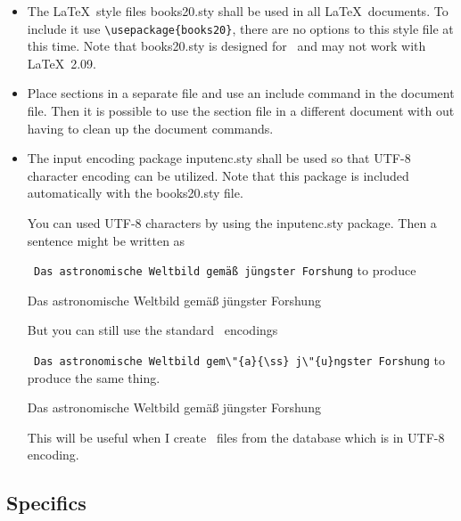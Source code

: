 \documentclass{article}
\begin{document}
\begin{itemize}
  
\item The \LaTeX\ style files books20.sty shall be used in all
  \LaTeX\ documents. To include it use \verb|\usepackage{books20}|, there
  are no options to this style file at this time. Note that books20.sty
  is designed for \LaTeXe\ and may not work with \LaTeX\ 2.09.
  

\item Place sections in a separate file and use an include command in the
  document file. Then it is possible to use the section file in a
  different document with out having to clean up the document commands.

\item {The input encoding package inputenc.sty shall be used so that
  UTF-8 character encoding can be utilized. Note that this package is
  included automatically with the books20.sty file.

  You can used UTF-8 characters by using the inputenc.sty
  package.  Then a sentence might be written as
  
  \verb| Das astronomische Weltbild gemäß jüngster Forshung|
  to produce

  Das astronomische Weltbild gemäß jüngster Forshung

  But you can still use the standard \LaTeXe\ encodings
  
  \verb| Das astronomische Weltbild gem\"{a}{\ss} j\"{u}ngster Forshung|
  to produce the same thing.

  Das astronomische Weltbild gem\"{a}{\ss} j\"{u}ngster Forshung

  This will be useful when I create \LaTeXe\ files from the database
  which is in UTF-8 encoding.
  }
  
\end{itemize}

\subsection{Specifics}
\end{document}
